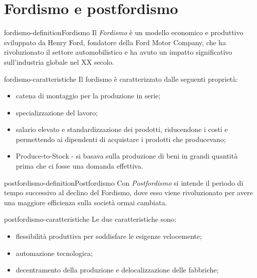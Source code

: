 \documentclass[preview]{standalone}
\begin{document}
\genpage

\section{Fordismo e postfordismo}

\begin{snippetdefinition}{fordismo-definition}{Fordismo}
    Il \textit{Fordismo} è un modello economico e produttivo sviluppato da Henry Ford,
    fondatore della Ford Motor Company, che ha rivoluzionato il settore automobilistico
    e ha avuto un impatto significativo sull'industria globale nel XX secolo.
\end{snippetdefinition}

\begin{snippet}{fordismo-caratteristiche}
    Il fordismo è caratterizzato dalle seguenti proprietà:
    \begin{itemize}
        \item catena di montaggio per la produzione in serie;
        \item specializzazione del lavoro;
        \item salario elevato e standardizzazione dei prodotti, riducendone i costi e permettendo ai dipendenti di acquistare i prodotti che producevano;
        \item Produce-to-Stock - si basava sulla produzione di beni in grandi quantità prima che ci fosse una domanda effettiva.
    \end{itemize}
\end{snippet}

\begin{snippetdefinition}{postfordismo-definition}{Postfordismo}
    Con \textit{Postfordismo} si intende il periodo di tempo
    successivo al declino del Fordismo, dove esso viene rivoluzionato per avere una maggiore efficienza
    sulla società ormai cambiata.
\end{snippetdefinition}

\begin{snippet}{postfordismo-caratteristiche}
    Le due caratteristiche sono:
    \begin{itemize}
        \item flessibilità produttiva per soddisfare le esigenze velocemente;
        \item automazione tecnologica;
        \item decentramento della produzione e delocalizzazione delle fabbriche;
    \end{itemize}
\end{snippet}
\end{document}
